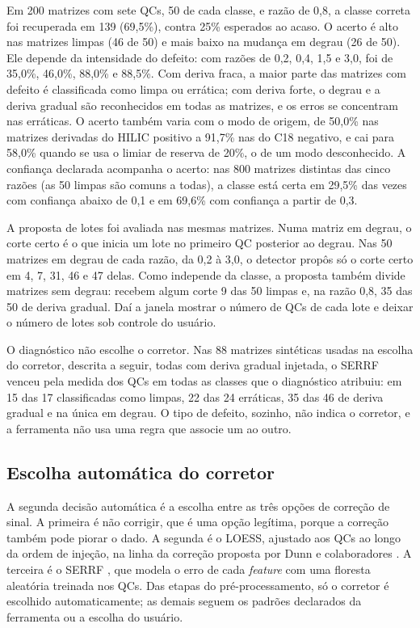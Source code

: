 Em 200 matrizes com sete QCs, 50 de cada classe, e razão de 0,8, a classe correta foi recuperada em 139 (69,5\%), contra 25\% esperados ao acaso. O acerto é alto nas matrizes limpas (46 de 50) e mais baixo na mudança em degrau (26 de 50). Ele depende da intensidade do defeito: com razões de 0,2, 0,4, 1,5 e 3,0, foi de 35,0\%, 46,0\%, 88,0\% e 88,5\%. Com deriva fraca, a maior parte das matrizes com defeito é classificada como limpa ou errática; com deriva forte, o degrau e a deriva gradual são reconhecidos em todas as matrizes, e os erros se concentram nas erráticas. O acerto também varia com o modo de origem, de 50,0\% nas matrizes derivadas do HILIC positivo a 91,7\% nas do C18 negativo, e cai para 58,0\% quando se usa o limiar de reserva de 20\%, o de um modo desconhecido. A confiança declarada acompanha o acerto: nas 800 matrizes distintas das cinco razões (as 50 limpas são comuns a todas), a classe está certa em 29,5\% das vezes com confiança abaixo de 0,1 e em 69,6\% com confiança a partir de 0,3.

A proposta de lotes foi avaliada nas mesmas matrizes. Numa matriz em degrau, o corte certo é o que inicia um lote no primeiro QC posterior ao degrau. Nas 50 matrizes em degrau de cada razão, da 0,2 à 3,0, o detector propôs só o corte certo em 4, 7, 31, 46 e 47 delas. Como independe da classe, a proposta também divide matrizes sem degrau: recebem algum corte 9 das 50 limpas e, na razão 0,8, 35 das 50 de deriva gradual. Daí a janela mostrar o número de QCs de cada lote e deixar o número de lotes sob controle do usuário.

O diagnóstico não escolhe o corretor. Nas 88 matrizes sintéticas usadas na escolha do corretor, descrita a seguir, todas com deriva gradual injetada, o SERRF venceu pela medida dos QCs em todas as classes que o diagnóstico atribuiu: em 15 das 17 classificadas como limpas, 22 das 24 erráticas, 35 das 46 de deriva gradual e na única em degrau. O tipo de defeito, sozinho, não indica o corretor, e a ferramenta não usa uma regra que associe um ao outro.

\subsection{Escolha automática do corretor}

A segunda decisão automática é a escolha entre as três opções de correção de sinal. A primeira é não corrigir, que é uma opção legítima, porque a correção também pode piorar o dado. A segunda é o LOESS, ajustado aos QCs ao longo da ordem de injeção, na linha da correção proposta por Dunn e colaboradores \cite{dunn2011procedures}. A terceira é o SERRF \cite{fan2019systematic}, que modela o erro de cada \emph{feature} com uma floresta aleatória treinada nos QCs. Das etapas do pré-processamento, só o corretor é escolhido automaticamente; as demais seguem os padrões declarados da ferramenta ou a escolha do usuário.

